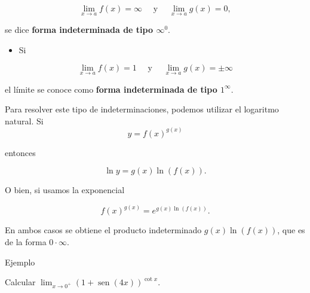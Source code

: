 \documentclass[
  letterpaper,
]{book}
\providecommand{\tightlist}{%
  \setlength{\itemsep}{0pt}\setlength{\parskip}{0pt}}
\theoremstyle{plain}
\theoremstyle{remark}
\begin{document}
\[
\lim_{x\to a}f(x)=\infty\quad\text{ y }\quad \lim_{x\to a}g(x)=0,
\]

se dice \textbf{forma indeterminada de tipo \(\infty^0\)}.

\begin{itemize}
\tightlist
\item
  Si
\end{itemize}

\[
\lim_{x\to a}f(x)=1\quad\text{ y }\quad \lim_{x\to a}g(x)=\pm \infty
\]

el límite se conoce como \textbf{forma indeterminada de tipo
\(1^\infty\)}.

Para resolver este tipo de indeterminaciones, podemos utilizar el
logaritmo natural. Si \[
y=f(x)^{g(x)}
\]

entonces

\[
\ln y=g(x)\ln(f(x)).
\]

O bien, si usamos la exponencial

\[
f(x)^{g(x)}=e^{g(x)\ln(f(x))}.
\]

En ambos casos se obtiene el producto indeterminado \(g(x)\ln(f(x))\),
que es de la forma \(0\cdot \infty\).

Ejemplo

Calcular \(\lim_{x\to 0^+}(1+\operatorname{sen}(4x))^{\cot x}\).
\end{document}
